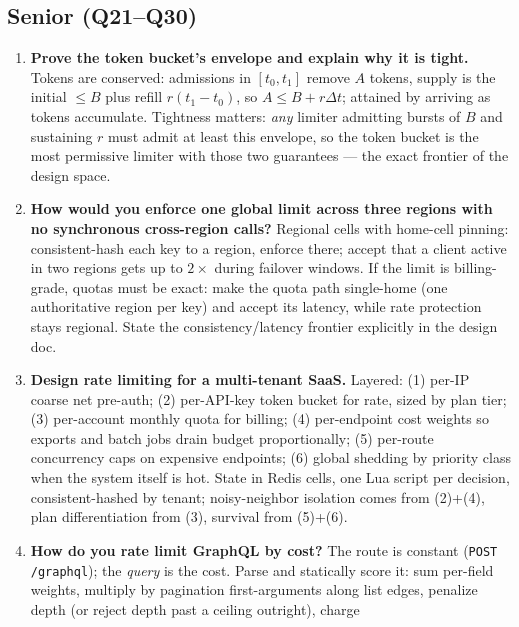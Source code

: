 \subsection*{Senior (Q21--Q30)}
\begin{enumerate}[label=\textbf{Q\arabic*.}, leftmargin=1.6cm, start=21]
  \item \textbf{Prove the token bucket's envelope and explain why it is
        tight.}
        Tokens are conserved: admissions in $[t_0, t_1]$ remove $A$ tokens,
        supply is the initial $\le B$ plus refill $r(t_1 - t_0)$, so
        $A \le B + r\Delta t$; attained by arriving as tokens accumulate.
        Tightness matters: \emph{any} limiter admitting bursts of $B$ and
        sustaining $r$ must admit at least this envelope, so the token
        bucket is the most permissive limiter with those two guarantees ---
        the exact frontier of the design space.
  \item \textbf{How would you enforce one global limit across three
        regions with no synchronous cross-region calls?}
        Regional cells with home-cell pinning: consistent-hash each key to
        a region, enforce there; accept that a client active in two regions
        gets up to $2\times$ during failover windows. If the limit is
        billing-grade, quotas must be exact: make the quota path
        single-home (one authoritative region per key) and accept its
        latency, while rate protection stays regional. State the
        consistency/latency frontier explicitly in the design doc.
  \item \textbf{Design rate limiting for a multi-tenant SaaS.}
        Layered: (1) per-IP coarse net pre-auth; (2) per-API-key token
        bucket for rate, sized by plan tier; (3) per-account monthly quota
        for billing; (4) per-endpoint cost weights so exports and batch
        jobs drain budget proportionally; (5) per-route concurrency caps on
        expensive endpoints; (6) global shedding by priority class when the
        system itself is hot. State in Redis cells, one Lua script per
        decision, consistent-hashed by tenant; noisy-neighbor isolation
        comes from (2)+(4), plan differentiation from (3), survival from
        (5)+(6).
  \item \textbf{How do you rate limit GraphQL by cost?}
        The route is constant (\texttt{POST /graphql}); the \emph{query} is
        the cost. Parse and statically score it: sum per-field weights,
        multiply by pagination first-arguments along list edges, penalize
        depth (or reject depth past a ceiling outright), charge

\end{enumerate}
